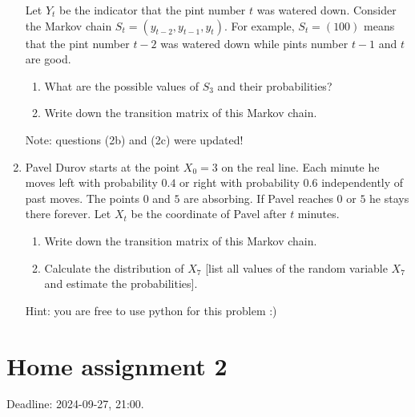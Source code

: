 \documentclass[12pt]{article}
\begin{document}
\begin{enumerate}
Let $Y_t$ be the indicator that the pint number $t$ was watered down. 
Consider the Markov chain $S_t = (y_{t-2}, y_{t-1}, y_t)$.
For example, $S_t = (100)$ means that the pint number $t-2$ was watered down while pints number $t-1$ and $t$ are good. 

\begin{enumerate}[resume]
\item What are the possible values of $S_3$ and their probabilities?
\item Write down the transition matrix of this Markov chain.
\end{enumerate}

Note: questions (2b) and (2c) were updated!

\item Pavel Durov starts at the point $X_0 = 3$ on the real line. 
Each minute he moves left with probability $0.4$ or right with probability $0.6$ independently of past moves.
The points $0$ and $5$ are absorbing. 
If Pavel reaches $0$ or $5$ he stays there forever.
Let $X_t$ be the coordinate of Pavel after $t$ minutes. 

\begin{enumerate}
    \item Write down the transition matrix of this Markov chain. 
    \item Calculate the distribution of $X_7$ [list all values of the random variable $X_7$ and estimate the probabilities].
\end{enumerate}



Hint: you are free to use python for this problem :)


\end{enumerate}


\section*{Home assignment 2}

Deadline: 2024-09-27, 21:00.
\end{document}
